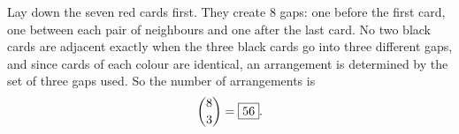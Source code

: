 Lay down the seven red cards first. They create $8$ gaps: one before the first card, one between each pair of neighbours and one after the last card. No two black cards are adjacent exactly when the three black cards go into three different gaps, and since cards of each colour are identical, an arrangement is determined by the set of three gaps used. So the number of arrangements is
\[
\dbinom83=\boxed{56}.
\]
